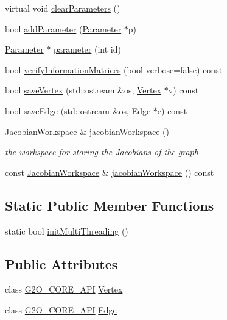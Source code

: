 \begin{DoxyCompactItemize}
virtual void \mbox{\hyperlink{structg2o_1_1_optimizable_graph_a15171b6d335115858e2e86dcf576ba78}{clear\+Parameters}} ()
\item 
bool \mbox{\hyperlink{structg2o_1_1_optimizable_graph_ad4a7c038288097b0b1619c609cf40e90}{add\+Parameter}} (\mbox{\hyperlink{classg2o_1_1_parameter}{Parameter}} $\ast$p)
\item 
\mbox{\hyperlink{classg2o_1_1_parameter}{Parameter}} $\ast$ \mbox{\hyperlink{structg2o_1_1_optimizable_graph_ad9506880a9289353ddd2277fafb76ffd}{parameter}} (int id)
\item 
bool \mbox{\hyperlink{structg2o_1_1_optimizable_graph_a23dbb64bd31deb3952d4149518e663ce}{verify\+Information\+Matrices}} (bool verbose=false) const
\item 
bool \mbox{\hyperlink{structg2o_1_1_optimizable_graph_a221656c91e253b4246553a33e33c3e6b}{save\+Vertex}} (std\+::ostream \&os, \mbox{\hyperlink{classg2o_1_1_optimizable_graph_1_1_vertex}{Vertex}} $\ast$v) const
\item 
bool \mbox{\hyperlink{structg2o_1_1_optimizable_graph_a3852abe611f2fd90a0a05979987615a2}{save\+Edge}} (std\+::ostream \&os, \mbox{\hyperlink{classg2o_1_1_optimizable_graph_1_1_edge}{Edge}} $\ast$e) const
\item 
\mbox{\hyperlink{classg2o_1_1_jacobian_workspace}{Jacobian\+Workspace}} \& \mbox{\hyperlink{structg2o_1_1_optimizable_graph_aa669dbd1d6e34e49fecda711ff1b78c6}{jacobian\+Workspace}} ()
\begin{DoxyCompactList}\small\item\em the workspace for storing the Jacobians of the graph \end{DoxyCompactList}\item 
const \mbox{\hyperlink{classg2o_1_1_jacobian_workspace}{Jacobian\+Workspace}} \& \mbox{\hyperlink{structg2o_1_1_optimizable_graph_a21d73e7a39c731d19e6bb467cad59912}{jacobian\+Workspace}} () const
\end{DoxyCompactItemize}
\subsection*{Static Public Member Functions}
\begin{DoxyCompactItemize}
\item 
static bool \mbox{\hyperlink{structg2o_1_1_optimizable_graph_ab4ee0fc3ecd31852276ded40b62e9c76}{init\+Multi\+Threading}} ()
\end{DoxyCompactItemize}
\subsection*{Public Attributes}
\begin{DoxyCompactItemize}
\item 
class \mbox{\hyperlink{g2o__core__api_8h_a7a8d7648d6f1e26632566f335751d064}{G2\+O\+\_\+\+C\+O\+R\+E\+\_\+\+A\+PI}} \mbox{\hyperlink{structg2o_1_1_optimizable_graph_ae1bdcfc2f7a1b8977ba04a16b16f1eba}{Vertex}}
\item 
class \mbox{\hyperlink{g2o__core__api_8h_a7a8d7648d6f1e26632566f335751d064}{G2\+O\+\_\+\+C\+O\+R\+E\+\_\+\+A\+PI}} \mbox{\hyperlink{structg2o_1_1_optimizable_graph_a59cf44f3f3182a367ee4525412c7940a}{Edge}}
\end{DoxyCompactItemize}
